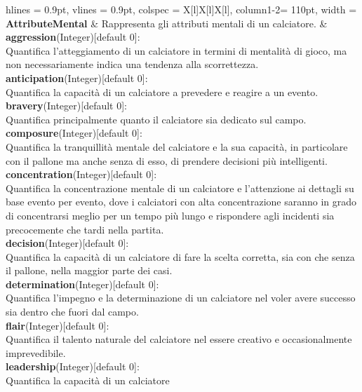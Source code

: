 \begin{tblr}{
    hlines = {0.9pt}, vlines = {0.9pt}, colspec = {X[l]X[l]X[l]}, column{1-2}= {110pt},
    width = \textwidth
}
	{
		\textbf{AttributeMental}
	}
	&
	{
		Rappresenta gli attributi mentali di un calciatore.
	}
	&
	{
		\textbf{aggression}(Integer)[default 0]:\\
			Quantifica l'atteggiamento di un calciatore
			in termini di mentalità di gioco, ma
			non necessariamente indica
			una tendenza alla scorrettezza.\\
		\medskip\textbf{anticipation}(Integer)[default 0]:\\
			 Quantifica la capacità di un calciatore a prevedere
			 e reagire a un evento.\\
		\medskip\textbf{bravery}(Integer)[default 0]:\\
			Quantifica principalmente quanto il calciatore
			sia dedicato sul campo.\\
		\medskip\textbf{composure}(Integer)[default 0]:\\
			Quantifica la tranquillità mentale del calciatore
			e la sua capacità, in particolare con il pallone
			ma anche senza di esso, di prendere decisioni
			più intelligenti.\\
		\medskip\textbf{concentration}(Integer)[default 0]:\\
			Quantifica la concentrazione mentale di un calciatore
			e l'attenzione ai dettagli su base evento per evento,
			dove i calciatori con alta concentrazione
			saranno in grado di concentrarsi meglio
			per un tempo più lungo e rispondere agli incidenti
			sia precocemente che tardi nella partita.\\
		\medskip\textbf{decision}(Integer)[default 0]:\\
			Quantifica la capacità di un calciatore
			di fare la scelta corretta, sia con
			che senza il pallone,
			nella maggior parte dei casi.\\
		\medskip\textbf{determination}(Integer)[default 0]:\\
			Quantifica l'impegno e la determinazione
			di un calciatore nel voler avere successo
			sia dentro che fuori dal campo.\\
		\medskip\textbf{flair}(Integer)[default 0]:\\
			Quantifica il talento naturale del calciatore
			nel essere creativo e occasionalmente imprevedibile.\\
		\medskip\textbf{leadership}(Integer)[default 0]:\\
			Quantifica la capacità di un calciatore
}
\end{tblr}
